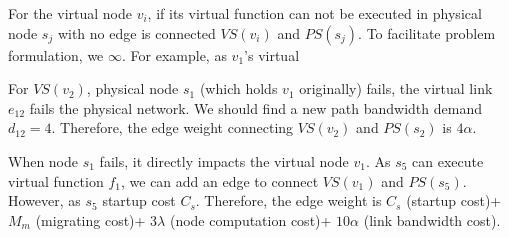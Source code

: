 




For the virtual node $v_i$, if its virtual function can not be executed in physical node $s_j$
with   no edge is connected  $VS(v_i)$  and $PS(s_j)$. To facilitate  problem formulation, we  $\infty $. For example, as $v_1$'s virtual 

For $VS(v_2)$,  physical node $s_1$ (which holds $v_1$ originally) fails, the virtual link $e_{12}$ fails   the physical network. We should find a new path  bandwidth demand  $d_{12}=4$. Therefore, the edge weight connecting $VS(v_2)$ and $PS(s_2)$ is $4\alpha$. 

When node $s_1$ fails, it directly impacts the virtual node $v_1$. As $s_5$ can execute  virtual function $f_1$, we can add an edge to  connect $VS(v_1)$ and $PS(s_5)$. However, as $s_5$  startup cost $C_s$.  Therefore, the edge weight is $C_s$ (startup cost)+ $M_m$ (migrating cost)+ $3\lambda $ (node computation cost)+ $10\alpha$ (link bandwidth cost). 

